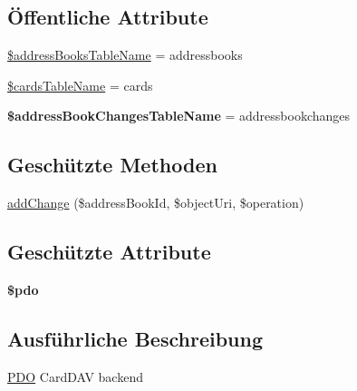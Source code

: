 \subsection*{Öffentliche Attribute}
\begin{DoxyCompactItemize}
\item 
\mbox{\hyperlink{class_sabre_1_1_card_d_a_v_1_1_backend_1_1_p_d_o_a8fed77838b39f7191e3d6a14faf6069c}{\$address\+Books\+Table\+Name}} = \textquotesingle{}addressbooks\textquotesingle{}
\item 
\mbox{\hyperlink{class_sabre_1_1_card_d_a_v_1_1_backend_1_1_p_d_o_a788e26adb04791e714eb53127f4f985b}{\$cards\+Table\+Name}} = \textquotesingle{}cards\textquotesingle{}
\item 
\mbox{\label{class_sabre_1_1_card_d_a_v_1_1_backend_1_1_p_d_o_a58fa7f3d470b1cf92e078166a3002c82}} 
{\bfseries \$address\+Book\+Changes\+Table\+Name} = \textquotesingle{}addressbookchanges\textquotesingle{}
\end{DoxyCompactItemize}
\subsection*{Geschützte Methoden}
\begin{DoxyCompactItemize}
\item 
\mbox{\hyperlink{class_sabre_1_1_card_d_a_v_1_1_backend_1_1_p_d_o_a99a64407b70fbc6e417161f2837e5393}{add\+Change}} (\$address\+Book\+Id, \$object\+Uri, \$operation)
\end{DoxyCompactItemize}
\subsection*{Geschützte Attribute}
\begin{DoxyCompactItemize}
\item 
\mbox{\label{class_sabre_1_1_card_d_a_v_1_1_backend_1_1_p_d_o_a13f08fb191125d7827c059f4d6dc4338}} 
{\bfseries \$pdo}
\end{DoxyCompactItemize}


\subsection{Ausführliche Beschreibung}
\mbox{\hyperlink{class_sabre_1_1_card_d_a_v_1_1_backend_1_1_p_d_o}{P\+DO}} Card\+D\+AV backend


